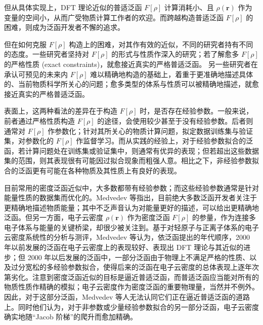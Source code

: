 但从具体实现上，DFT 理论近似的普适泛函 $F[\rho]$ 计算消耗小、且 $\rho(\bm{r})$ 作为变量的空间小，从而广受物质计算工作者的欢迎。而跨越构造普适泛函 $F[\rho]$ 的困难，则成为泛函开发者不懈的追求。

但在如何克服 $F[\rho]$ 构造上的困难，对其作有效的近似，不同的研究者持有不同的态度。一些研究者坚持对 $F[\rho]$ 的形式与性质作深入的研究；若了解愈多 $F[\rho]$ 的严格性质 (exact constraints)，就愈接近真实的严格普适泛函\cite{Kohn-Sham.PR.1965, Slater-Slater.PR.1951, Vosko-Nusair.CJP.1980, Perdew-Ernzerhof.PRL.1996, Adamo-Barone.JCP.1999, Ernzerhof-Scuseria.JCP.1999, Tao-Scuseria.PRL.2003, Cohen-Yang.CR.2012, Su-Xu.JCP.2014, Sun-Perdew.PRL.2015, Medvedev-Lyssenko.S.2017}。
另一些研究者在承认可预见的未来内 $F[\rho]$ 难以精确地构造的基础上，着重于更准确地描述具体的、当前物质科学所关心的问题；愈多类型的体系与性质可以被精确地描述，就愈接近真实的严格普适泛函\cite{Becke-Becke.PRA.1988, Lee-Parr.PRB.1988, Becke-Becke.JCP.1993, Zhao-Truhlar.JCP.2006, Grimme-Grimme.JCP.2006, Zhao-Truhlar.TCA.2008, Zhang-Goddard.PNAS.2009, Chai-Head-Gordon.JCP.2009, Zhang-Goddard.PNAS.2011, Zhang-Xu.JCP.2012, Yu-Truhlar.JCP.2016, Chen-Weinan.JCTC.2021}。

表面上，这两种看法的差异在于构造 $F[\rho]$ 时，是否存在经验参数。一般来说，前者通过严格性质构造 $F[\rho]$ 的途径，会使用较少甚至于没有经验参数。后者则通常对 $F[\rho]$ 作参数化；针对其所关心的物质计算问题，拟定数据训练集与验证集，对参数化的 $F[\rho]$ 作监督学习。而从实践的经验上，对于经验参数拟合的泛函，若计算问题处在训练集或验证集中，则通常有优异的表现；但若超出这些数据集的范围，则其表现很有可能因过拟合现象而粗强人意。相比之下，非经验参数拟合的泛函更有可能在各种物质及其性质上有良好的表现。

目前常用的密度泛函近似中，大多数都带有经验参数；而这些经验参数通常是针对能量性质的数据集而优化的。Medvedev 等\cite{Medvedev-Lyssenko.S.2017}指出，目前绝大多数泛函开发者关注于更精确地描述物质能量；其中不乏声音认为对能量更好的描述，可以给出更精确地泛函。但另一方面，电子云密度 $\rho(\bm{r})$ 作为密度泛函 $F[\rho]$ 的参量，作为连接多电子体系与能量的关键桥梁，却很少被关注到。基于对轻原子与正离子体系的电子云密度系统性的分析与测评，Medvedev 等认为，依泛函提出的年代顺序，2000 年以前发展的泛函在电子云密度上的表现较好、表现出 DFT 理论与其近似的进步；但 2000 年以后发展的泛函中，一部分泛函由于物理上不满足严格的性质、以及过分宽松的多经验参数拟合，使得后来的泛函在电子云密度的总体表现上逐年次第劣化。注意到密度泛函近似的目标是逼近普适泛函，而普适泛函应当能对所有的物质性质作精确的模拟；电子云密度作为密度泛函的重要物理量，当然并不例外。因此，对于这部分泛函，Medvedev 等人无法认同它们正在逼近普适泛函的道路上。同时他们认为，对于非参数或少量经验参数拟合的另一部分泛函，电子云密度确实地随“Jacob 阶梯”\cite{Perdew-Schmidt.ACP.2001}的爬升而愈加精确。

